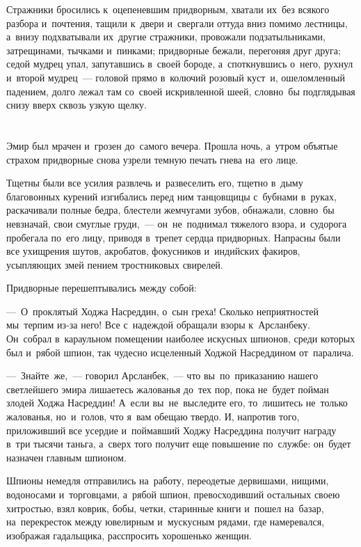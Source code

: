 \documentclass[12pt,a4paper]{book}
\begin{document}
Стражники бросились к~оцепеневшим придворным, хватали их~без всякого разбора и~почтения, тащили к~двери и~свергали оттуда вниз помимо лестницы, а~внизу подхватывали их~другие стражники, провожали подзатыльниками, затрещинами, тычками и~пинками; придворные бежали, перегоняя друг друга; седой мудрец упал, запутавшись в~своей бороде, а~споткнувшись о~него, рухнул и~второй мудрец~— головой прямо в~колючий розовый куст~и, ошеломленный падением, долго лежал там со~своей искривленной шеей, словно~бы подглядывая снизу вверх сквозь узкую щелку.


\chapter{}

Эмир был мрачен и~грозен до~самого вечера. Прошла ночь, а~утром объятые страхом придворные снова узрели темную печать гнева на~его лице.

Тщетны были все усилия развлечь и~развеселить его, тщетно в~дыму благовонных курений изгибались перед ним танцовщицы с~бубнами в~руках, раскачивали полные бедра, блестели жемчугами зубов, обнажали, словно~бы невзначай, свои смуглые груди,~— он~не~поднимал тяжелого взора, и~судорога пробегала по~его лицу, приводя в~трепет сердца придворных. Напрасны были все ухищрения шутов, акробатов, фокусников и~индийских факиров, усыпляющих змей пением тростниковых свирелей.

Придворные перешептывались между собой:

—~О~проклятый Ходжа Насреддин, о~сын греха! Сколько неприятностей мы~терпим из-за него! Все с~надеждой обращали взоры к~Арсланбеку. Он~собрал в~караульном помещении наиболее искусных шпионов, среди которых был и~рябой шпион, так чудесно исцеленный Ходжой Насреддином от~паралича.

—~Знайте~же,~— говорил Арсланбек,~— что вы~по~приказанию нашего светлейшего эмира лишаетесь жалованья до~тех пор, пока не~будет пойман злодей Ходжа Насреддин! А~если вы~не~выследите его, то~лишитесь не~только жалованья, но~и~голов, что я~вам обещаю твердо. И, напротив того, приложивший все усердие и~поймавший Ходжу Насреддина получит награду в~три тысячи таньга, а~сверх того получит еще повышение по~службе: он~будет назначен главным шпионом.

Шпионы немедля отправились на~работу, переодетые дервишами, нищими, водоносами и~торговцами, а~рябой шпион, превосходивший остальных своею хитростью, взял коврик, бобы, четки, старинные книги и~пошел на~базар, на~перекресток между ювелирным и~мускусным рядами, где намеревался, изображая гадальщика, расспросить хорошенько женщин.
\end{document}
